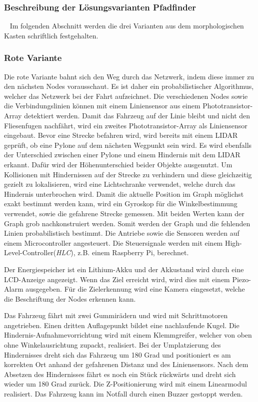 \documentclass[main.tex]{subfiles} %
\begin{document}

\subsubsection{Beschreibung der Lösungsvarianten Pfadfinder}~\label{sec:variantenbeschreib}
Im folgenden Abschnitt werden die drei Varianten aus dem morphologischen Kasten
schriftlich festgehalten.

\subsubsection*{Rote Variante}
Die rote Variante bahnt sich den Weg durch das Netzwerk, indem diese immer zu
den nächsten Nodes vorausschaut. Es ist daher ein probabilistischer
Algorithmus, welcher das Netzwerk bei der Fahrt aufzeichnet. Die verschiedenen
Nodes sowie die Verbindungslinien können mit einem Liniensensor aus einem
Phototransistor-Array detektiert werden. Damit das Fahrzeug auf der Linie
bleibt und nicht den Fliesenfugen nachfährt, wird ein zweites
Phototransistor-Array als Liniensensor eingebaut. Bevor eine Strecke befahren
wird, wird bereits mit einem LIDAR geprüft, ob eine Pylone auf dem nächsten
Wegpunkt sein wird. Es wird ebenfalls der Unterschied zwischen einer Pylone und
einem Hindernis mit dem LIDAR erkannt. Dafür wird der Höhenunterschied beider
Objekte ausgenutzt. Um Kollisionen mit Hindernissen auf der Strecke zu
verhindern und diese gleichzeitig gezielt zu lokalisieren, wird eine
Lichtschranke verwendet, welche durch das Hindernis unterbrochen wird. Damit
die aktuelle Position im Graph möglichst exakt bestimmt werden kann, wird ein
Gyroskop für die Winkelbestimmung verwendet, sowie die gefahrene Strecke
gemessen. Mit beiden Werten kann der Graph grob nachkonstruiert werden. Somit
werden der Graph und die fehlenden Linien probabilistisch bestimmt. Die
Antriebe sowie die Sensoren werden auf einem Microcontroller angesteuert. Die
Steuersignale werden mit einem High-Level-Controller(\textit{HLC}), z.B. einem
Raspberry Pi, berechnet.

Der Energiespeicher ist ein Lithium-Akku und der Akkustand wird durch eine
LCD-Anzeige angezeigt. Wenn das Ziel erreicht wird, wird dies mit einem
Piezo-Alarm ausgegeben. Für die Zielerkennung wird eine Kamera eingesetzt,
welche die Beschriftung der Nodes erkennen kann.

Das Fahrzeug fährt mit zwei Gummirädern und wird mit
Schrittmotoren angetrieben. Einen dritten Auflagepunkt bildet eine nachlaufende Kugel. Die Hindernis-Aufnahmevorrichtung
wird mit einem Klemmgreifer, welcher von oben ohne Winkelausrichtung zupackt,
realisiert. Bei der Umplatzierung des Hindernisses dreht sich das Fahrzeug um
180 Grad und positioniert es am korrekten Ort anhand der gefahrenen Distanz und
des Liniensensors. Nach dem Absetzen des Hindernisses fährt es noch ein Stück
rückwärts und dreht sich wieder um 180 Grad zurück. Die Z-Positionierung wird
mit einem Linearmodul realisiert. Das Fahrzeug kann im Notfall durch einen Buzzer
gestoppt werden.
\end{document}

